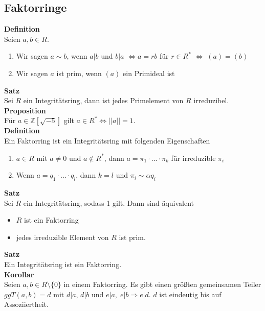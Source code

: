 \documentclass[a4paper, 12pt]{article}
\begin{document}
\subsection{Faktorringe}
\textbf{Definition}\\
Seien $a,b \in R$.  \begin{enumerate}
	\item Wir sagen $a \sim b$, wenn $a|b$ und $b|a$ $\Leftrightarrow a = rb$ für $r \in R^*$ $\Leftrightarrow \; (a) = (b)$
	\item Wir sagen $a$ ist prim, wenn $(a)$ ein Primideal ist
\end{enumerate}
\textbf{Satz}\\
Sei $R$ ein Integritätsring, dann ist jedes Primelement von $R$ irreduzibel.\\
\textbf{Proposition}\\
Für $a \in \mathbb{Z}[\sqrt{-5}]$ gilt $a \in R^* \Leftrightarrow \left|\left|a\right|\right| = 1$.\\
\textbf{Definition}\\
Ein Faktorring ist ein Integritätsring mit folgenden Eigenschaften \begin{enumerate}
	\item $a \in R$ mit $a\neq 0$ und $a \notin R^*$, dann $a = \pi_1\cdot ... \cdot \pi_k$ für irreduzible $\pi_i$
	\item Wenn $a = q_1 \cdot ... \cdot q_l$, dann $k = l$ und $\pi_i \sim \alpha q_i$
\end{enumerate}
\textbf{Satz}\\
Sei $R$ ein Integritätsring, sodass 1 gilt. Dann sind äquivalent \begin{itemize}
	\item $R$ ist ein Faktorring
	\item jedes irreduzible Element von $R$ ist prim.
\end{itemize}
\textbf{Satz}\\
Ein Integritätsring ist ein Faktorring.\\
\textbf{Korollar}\\
Seien $a,b \in R\setminus\{0\}$ in einem Faktorring. Es gibt einen größten gemeinsamen Teiler $ggT(a,b) = d$ mit $d | a$, $d | b$ und $e | a, \; e | b \Rightarrow e | d$. $d$ ist eindeutig bis auf Assoziiertheit.
\end{document}
